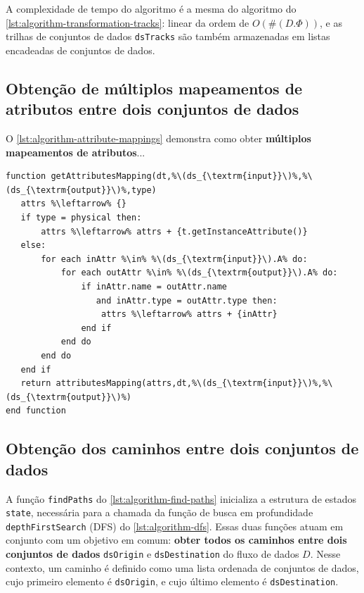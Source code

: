 A complexidade de tempo do algoritmo é a mesma do algoritmo do \autoref{lst:algorithm-transformation-tracks}: linear da ordem de \( O(\#(D.\Phi)) \), e as trilhas de conjuntos de dados \texttt{dsTracks} são também armazenadas em listas encadeadas de conjuntos de dados.

\subsection{Obtenção de múltiplos mapeamentos de atributos entre dois conjuntos de dados}

O \autoref{lst:algorithm-attribute-mappings} demonstra como obter \textbf{múltiplos mapeamentos de atributos}...


\begin{minipage}[c]{0.95\textwidth}
\begin{lstlisting}[language=pseudocode,label={lst:algorithm-attribute-mappings},caption={[Obtenção de múltiplos mapeamentos de atributos]Obtenção de múltiplos mapeamentos de atributos entre dois conjuntos de dados adjacentes.}]
function getAttributesMapping(dt,%\(ds_{\textrm{input}}\)%,%\(ds_{\textrm{output}}\)%,type)
   attrs %\leftarrow% {}
   if type = physical then:
       attrs %\leftarrow% attrs + {t.getInstanceAttribute()}
   else:
       for each inAttr %\in% %\(ds_{\textrm{input}}\).A% do:
           for each outAttr %\in% %\(ds_{\textrm{output}}\).A% do:
               if inAttr.name = outAttr.name
                  and inAttr.type = outAttr.type then:
                   attrs %\leftarrow% attrs + {inAttr}
               end if
           end do
       end do
   end if
   return attributesMapping(attrs,dt,%\(ds_{\textrm{input}}\)%,%\(ds_{\textrm{output}}\)%)
end function
\end{lstlisting}
\end{minipage}


\subsection{Obtenção dos caminhos entre dois conjuntos de dados}

A função \texttt{findPaths} do \autoref{lst:algorithm-find-paths} inicializa a estrutura de estados \texttt{state}, necessária para a chamada da função de busca em profundidade  \texttt{depthFirstSearch} (DFS) do \autoref{lst:algorithm-dfs}. Essas duas funções atuam em conjunto com um objetivo em comum: \textbf{obter todos os caminhos entre dois conjuntos de dados} \texttt{dsOrigin} e \texttt{dsDestination} do fluxo de dados \(D\).
Nesse contexto, um caminho é definido como uma lista ordenada de conjuntos de dados, cujo primeiro elemento é \texttt{dsOrigin}, e cujo último elemento é \texttt{dsDestination}.

